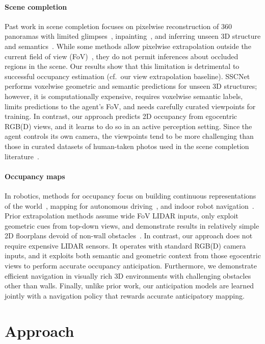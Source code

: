 \documentclass[runningheads]{llncs}
\begin{document}
\paragraph{Scene completion} Past work in scene completion focuses on pixelwise reconstruction of 360 panoramas with limited glimpses~\cite{dinesh2018ltla,ramakrishnan2018sidekick,ramakrishnan2019emergence,seifi2019look}, inpainting~\cite{Pathak_2016_CVPR,iizuka2017globally,li2017generative}, and inferring unseen 3D structure and semantics~\cite{song2018im2pano3d,Yang_2019_CVPR}. While some methods allow pixelwise extrapolation outside the current field of view (FoV)~\cite{ramakrishnan2019emergence,song2018im2pano3d,Yang_2019_CVPR,jayaraman2018shapecodes}, they do not permit inferences about occluded regions in the scene. Our results show that this limitation is detrimental to successful occupancy estimation (cf.~our view extrapolation baseline).  SSCNet~\cite{song2016ssc} performs voxelwise geometric and semantic predictions for unseen 3D structures; however, it is computationally expensive, requires voxelwise semantic labels, limits predictions to the agent's FoV, and needs carefully curated viewpoints for training. In contrast, our approach predicts 2D occupancy from egocentric RGB(D) views, and it learns to do so in an active perception setting. Since the agent controls its own camera, the viewpoints tend to be more challenging than those in curated datasets of human-taken photos used in the scene completion literature~\cite{song2016ssc,song2018im2pano3d,dinesh2018ltla,ramakrishnan2018sidekick,Yang_2019_CVPR}.


\paragraph{Occupancy maps}
In robotics, methods for occupancy focus on building continuous representations of the world~\cite{o2012gaussian,ramos2016hilbert,senanayake2017deep}, mapping for autonomous driving~\cite{hoermann2018dynamic,mohajerin2019multi,sless2019self,lu2019hallucinating,muller2018driving}, and indoor robot navigation~\cite{katyal2019uncertainty,elhafsi2019map,shrestha2019learned}. Prior extrapolation methods assume wide FoV LIDAR inputs, only exploit geometric cues from top-down views, and demonstrate results in relatively simple 2D floorplans devoid of non-wall obstacles~\cite{katyal2018occupancy,katyal2019uncertainty,elhafsi2019map,shrestha2019learned}. In contrast, our approach does not require expensive LIDAR sensors. It operates with standard RGB(D) camera inputs, and it exploits both semantic and geometric context from those egocentric views to perform accurate occupancy anticipation. Furthermore, we demonstrate efficient navigation in visually rich 3D environments with challenging obstacles other than walls. Finally, unlike prior work, our anticipation models are learned jointly with a navigation policy that rewards accurate anticipatory mapping. \section{Approach}
\end{document}

